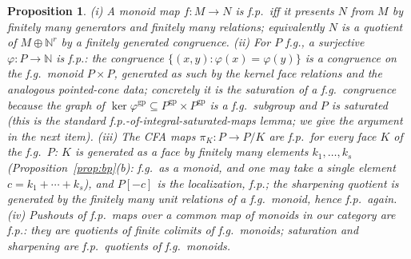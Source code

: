 \documentclass[11pt]{article}
\newtheorem{proposition}[theorem]{Proposition}
\theoremstyle{definition}
\newcommand{\gp}{\mathrm{gp}}
\begin{document}
\begin{proposition}\label{prop:fp}
\textup{(}i\textup{)} A monoid map $f:M\to N$ is f.p.\ iff it
presents $N$ from $M$ by finitely many generators and finitely
many relations; equivalently $N$ is a quotient of
$M\oplus\mathbb N^r$ by a finitely generated congruence.
\textup{(}ii\textup{)} For $P$ f.g., a surjective $\varphi:P\to
\mathbb N$ is f.p.: the congruence
$\{(x,y):\varphi(x)=\varphi(y)\}$ is a congruence on the f.g.\
monoid $P\times P$, generated as such by the kernel face
relations and the analogous pointed-cone data; concretely it is
the saturation of a f.g.\ congruence because the graph of
$\ker\varphi^{\gp}\subseteq P^{\gp}\times P^{\gp}$ 
is a f.g.\
 subgroup and $P$ is saturated \textup{(}this is the standard
f.p.-of-integral-saturated-maps lemma; we give the argument in
the next item\textup{)}.
\textup{(}iii\textup{)} The CFA maps $\pi_K:P\to P/K$ are f.p.\
for every face $K$ of the f.g.\ $P$: $K$ is generated as a face
by finitely many elements $k_1,\dots,k_s$
\textup{(}Proposition~\ref{prop:bp}\textup{(}b\textup{):} f.g.\
as a monoid, and one may take a single element
$c=k_1+\cdots+k_s$\textup{)}, and $P[-c]$ is the localization,
f.p.; the sharpening quotient is generated by the finitely many
unit relations of a f.g.\ monoid, hence f.p.\ again.
\textup{(}iv\textup{)} Pushouts of f.p.\ maps over a common map
of monoids in our category are f.p.: they are quotients of
finite colimits of f.g.\ monoids; saturation and sharpening are
f.p.\ quotients of f.g.\ monoids.
\end{proposition}
\end{document}
